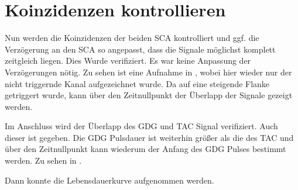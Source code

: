 
\section{Koinzidenzen kontrollieren}
Nun werden die Koinzidenzen der beiden SCA kontrolliert und ggf. die Verzögerung an den SCA so angepasst, dass die Signale möglichst komplett zeitgleich liegen. Dies Wurde verifiziert. Es war keine Anpassung der Verzögerungen nötig. Zu sehen ist eine Aufnahme in , wobei hier wieder nur der nicht triggernde Kanal aufgezeichnet wurde. Da auf eine steigende Flanke getriggert wurde, kann über den Zeitnullpunkt der Überlapp der Signale gezeigt werden.


Im Anschluss wird der Überlapp des GDG und TAC Signal verifiziert. Auch dieser ist gegeben. Die GDG Pulsdauer ist weiterhin größer als die des TAC und über den Zeitnullpunkt kann wiederum der Anfang des GDG Pulses bestimmt werden. Zu sehen in .

Dann konnte die Lebensdauerkurve aufgenommen werden.
